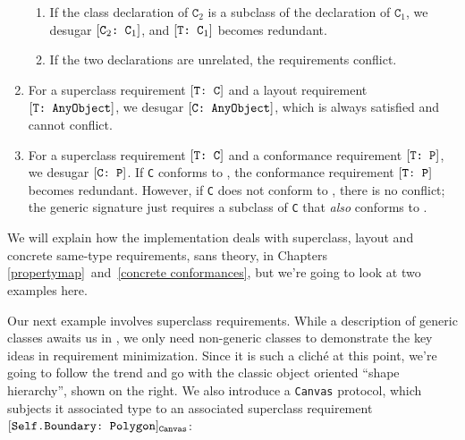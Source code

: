 \documentclass[../generics]{subfiles}
\begin{document}
\begin{definition}
\begin{enumerate}
\begin{enumerate}
\item If the class declaration of $\texttt{C}_2$ is a subclass of the declaration of $\texttt{C}_1$, we desugar $[\texttt{$\texttt{C}_2$:~$\texttt{C}_1$}]$, and $[\texttt{T:~$\texttt{C}_1$}]$ becomes redundant.
\item If the two declarations are unrelated, the requirements conflict.
\end{enumerate}
\item For a superclass requirement $[\texttt{T:~C}]$ and a layout requirement $[\texttt{T:~AnyObject}]$, we desugar $[\texttt{C:~AnyObject}]$, which is always satisfied and cannot conflict.
\item For a superclass requirement $[\texttt{T:~C}]$ and a conformance requirement $[\texttt{T:~P}]$, we desugar $[\texttt{C:~P}]$. If \texttt{C} conforms to \tP, the conformance requirement $[\texttt{T:~P}]$ becomes redundant. However, if \texttt{C} does not conform to \tP, there is no conflict; the generic signature just requires a subclass of \texttt{C} that \emph{also} conforms to \tP.
\end{enumerate}
\end{definition}

We will explain how the implementation deals with superclass, layout and concrete same-type requirements, sans theory, in Chapters \ref{propertymap}~and~\ref{concrete conformances}, but we're going to look at two examples here.

\smallskip

\begin{wrapfigure}[8]{r}{4.2cm}
\begin{center}
\end{center}
\end{wrapfigure}

Our next example involves superclass requirements. While a description of generic classes awaits us in , we only need non-generic classes to demonstrate the key ideas in requirement minimization. Since it is such a clich\'e at this point, we're going to follow the trend and go with the classic object oriented ``shape hierarchy'', shown on the right. We also introduce a \texttt{Canvas} protocol, which subjects it associated type to an associated superclass requirement $[\texttt{Self.Boundary:~Polygon}]_{\texttt{Canvas}}$:
\end{document}
